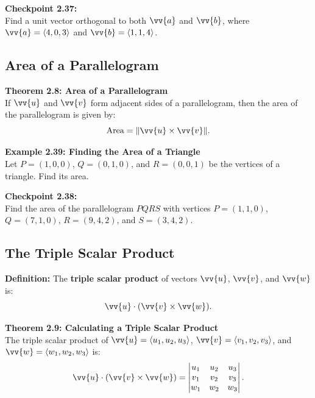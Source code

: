 \documentclass{article}
\begin{document}
\begin{exercisebox}
    \textbf{Checkpoint 2.37:} \\
    Find a unit vector orthogonal to both \(\vv{a}\) and \(\vv{b}\), where \(\vv{a} = \langle 4, 0, 3 \rangle\) and \(\vv{b} = \langle 1, 1, 4 \rangle\).
\end{exercisebox}

\subsection*{Area of a Parallelogram}

\begin{theorembox}
    \textbf{Theorem 2.8: Area of a Parallelogram} \\
    If \(\vv{u}\) and \(\vv{v}\) form adjacent sides of a parallelogram, then the area of the parallelogram is given by:
    \[
    \text{Area} = \|\vv{u} \times \vv{v}\|.
    \]
\end{theorembox}

\begin{examplebox}
    \textbf{Example 2.39: Finding the Area of a Triangle} \\
    Let \(P = (1, 0, 0)\), \(Q = (0, 1, 0)\), and \(R = (0, 0, 1)\) be the vertices of a triangle. Find its area.
\end{examplebox}

\begin{exercisebox}
    \textbf{Checkpoint 2.38:} \\
    Find the area of the parallelogram \(PQRS\) with vertices \(P = (1, 1, 0)\), \(Q = (7, 1, 0)\), \(R = (9, 4, 2)\), and \(S = (3, 4, 2)\).
\end{exercisebox}

\subsection*{The Triple Scalar Product}

\begin{definitionbox}
    \textbf{Definition:} The \textbf{triple scalar product} of vectors \(\vv{u}\), \(\vv{v}\), and \(\vv{w}\) is:
    \[
    \vv{u} \cdot (\vv{v} \times \vv{w}).
    \]
\end{definitionbox}

\begin{theorembox}
    \textbf{Theorem 2.9: Calculating a Triple Scalar Product} \\
    The triple scalar product of \(\vv{u} = \langle u_1, u_2, u_3 \rangle\), \(\vv{v} = \langle v_1, v_2, v_3 \rangle\), and \(\vv{w} = \langle w_1, w_2, w_3 \rangle\) is:
    \[
    \vv{u} \cdot (\vv{v} \times \vv{w}) = \begin{vmatrix}
    u_1 & u_2 & u_3 \\
    v_1 & v_2 & v_3 \\
    w_1 & w_2 & w_3
    \end{vmatrix}.
    \]
\end{theorembox}
\end{document}
